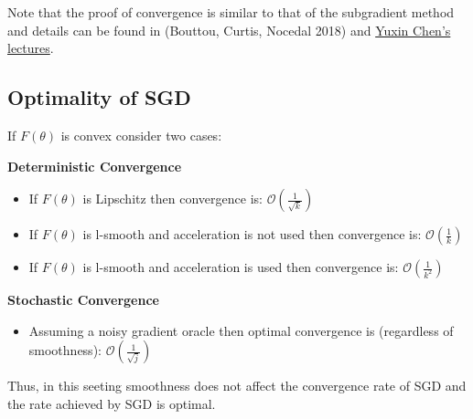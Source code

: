 Note that the proof of convergence is similar to that of the subgradient method and details can be found in (Bouttou, Curtis, Nocedal 2018) and \href{http://www.princeton.edu/~yc5/ele522_optimization/lectures/stochastic_gradient.pdf}{Yuxin Chen's lectures}.


\subsection{Optimality of SGD}
If $F(\theta)$ is convex consider two cases:

\noindent \textbf{Deterministic Convergence}
\begin{itemize}
	\item If $F(\theta)$ is Lipschitz then convergence is: $\mathcal{O}\left(\frac{1}{\sqrt{k}}\right)$
	\item If $F(\theta)$ is l-smooth and acceleration is not used then convergence is: $\mathcal{O}\left(\frac{1}{k}\right)$
	\item If $F(\theta)$ is l-smooth and acceleration is used then convergence is: $\mathcal{O}\left(\frac{1}{k^2}\right)$
\end{itemize}

\noindent \textbf{Stochastic Convergence}
\begin{itemize}
	\item Assuming a noisy gradient oracle then optimal convergence is (regardless of smoothness): $ \mathcal{O}\left(\frac{1}{\sqrt{j}}\right)$
\end{itemize}

Thus, in this seeting smoothness does not affect the convergence rate of SGD and the rate achieved by SGD is optimal. 